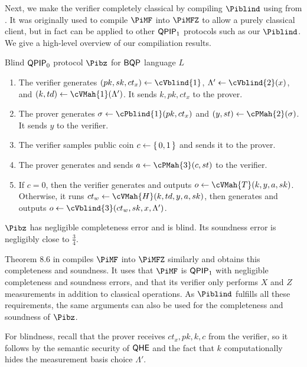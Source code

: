 
Next, we make the verifier completely classical by compiling $\Piblind$ using  from \cite{FOCS:Mahadev18a}.
It was originally used to compile $\PiMF$ into $\PiMFZ$ to allow a purely classical client,
but in fact can be applied to other $\operatorname{\mathsf{QPIP}}_1$ protocols such as our $\Piblind$.
We give a high-level overview of our compiliation results.

\begin{protocol}{Blind $\operatorname{\mathsf{QPIP}}_0$ protocol $\Pibz$ for $\operatorname{\mathsf{BQP}}$ language $L$}
	\label{proto:QPIP0BQP}
	\begin{enumerate}
		\item The verifier generates $(pk, sk, ct_x)\leftarrow\cVblind{1}$,
			$\Lambda'\leftarrow\cVblind{2}(x)$,
			and $(k, td)\leftarrow\cVMah{1}(\Lambda')$.
			It sends $k, pk, ct_x$ to the prover.
		\item The prover generates $\sigma\leftarrow\cPblind{1}(pk, ct_x)$ and
			$(y, st)\leftarrow\cPMah{2}(\sigma)$.
			It sends $y$ to the verifier.
		\item The verifier samples public coin $c\leftarrow\set{0, 1}$ and sends it to the prover.
		\item The prover generates and sends $a\leftarrow\cPMah{3}(c, st)$ to the verifier.
		\item If $c=0$, then the verifier generates and outputs $o\leftarrow\cVMah{T}(k, y, a, sk)$.
			Otherwise, it runs $ct_w\leftarrow\cVMah{H}(k, td, y, a, sk)$,
			then generates and outputs $o\leftarrow\cVblind{3}(ct_w, sk, x, \Lambda')$.
	\end{enumerate}
\end{protocol}

\begin{thm}
	$\Pibz$ has negligible completeness error and is blind. Its soundness error is negligibly close to $\frac{3}{4}$.
\end{thm}
\begin{prf}
	Theorem $8.6$ in \cite{FOCS:Mahadev18a} compiles $\PiMF$ into $\PiMFZ$ similarly and obtains this completeness and soundness.
	It uses that $\PiMF$ is $\operatorname{\mathsf{QPIP}}_1$ with negligible completeness and soundness errors,
	and that its verifier only performs $X$ and $Z$ measurements in addition to classical operations.
	As $\Piblind$ fulfills all these requirements, the same arguments can also be used for the completeness and soundness of $\Pibz$.

	For blindness, recall that the prover receives $ct_x, pk, k, c$ from the verifier,
	so it follows by the semantic security of $\mathsf{QHE}$ and the fact that $k$ computationally hides the measurement basis choice $\Lambda'$.
\end{prf}

